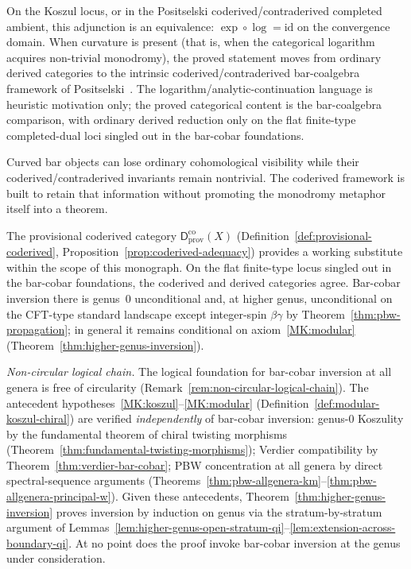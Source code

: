 On the Koszul locus, or in the Positselski coderived/contraderived
completed ambient, this adjunction is an equivalence:
$\exp \circ \log = \mathrm{id}$ on the convergence domain. When curvature is present (that is,
when the categorical logarithm acquires non-trivial monodromy), the
proved statement moves from ordinary derived categories to the
intrinsic coderived/contraderived bar-coalgebra framework of
Positselski~\cite{Positselski11}. The logarithm/analytic-continuation
language is heuristic motivation only; the proved categorical content
is the bar-coalgebra comparison, with ordinary derived reduction only
on the flat finite-type completed-dual loci singled out in the
bar-cobar foundations.

Curved bar objects can lose ordinary cohomological visibility while
their coderived/contraderived invariants remain nontrivial. The
coderived framework is built to retain that information without
promoting the monodromy metaphor itself into a theorem.

The provisional coderived category
$\mathsf{D}^{\mathrm{co}}_{\mathrm{prov}}(X)$
(Definition~\ref{def:provisional-coderived},
Proposition~\ref{prop:coderived-adequacy})
provides a working substitute within the scope of this monograph.
On the flat finite-type locus singled out in the bar-cobar
foundations, the coderived and derived categories agree.
Bar-cobar inversion there is genus~$0$ unconditional and, at higher
genus, unconditional on the CFT-type standard landscape except
integer-spin $\beta\gamma$ by
Theorem~\ref{thm:pbw-propagation}; in general it remains
conditional on axiom~\ref{MK:modular}
\textup{(}Theorem~\ref{thm:higher-genus-inversion}\textup{)}.

\emph{Non-circular logical chain.}
The logical foundation for bar-cobar inversion at all genera
is free of circularity
(Remark~\ref{rem:non-circular-logical-chain}).
The antecedent
hypotheses~\ref{MK:koszul}--\ref{MK:modular}
(Definition~\ref{def:modular-koszul-chiral}) are verified
\emph{independently} of bar-cobar inversion: genus-$0$ Koszulity
by the fundamental theorem of chiral twisting morphisms
(Theorem~\ref{thm:fundamental-twisting-morphisms}); Verdier
compatibility by Theorem~\ref{thm:verdier-bar-cobar}; PBW
concentration at all genera by direct spectral-sequence arguments
(Theorems~\ref{thm:pbw-allgenera-km}--\ref{thm:pbw-allgenera-principal-w}).
Given these antecedents, Theorem~\ref{thm:higher-genus-inversion}
proves inversion by induction on genus via the stratum-by-stratum
argument of
Lemmas~\ref{lem:higher-genus-open-stratum-qi}--\ref{lem:extension-across-boundary-qi}.
At no point does the proof invoke bar-cobar inversion at the
genus under consideration.

